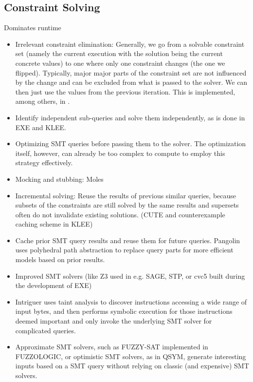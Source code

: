 \documentclass{article}
\begin{document}
\begin{multicols}{2}
    \subsection{Constraint Solving}
    \label{ConstraintSolving}
    Dominates runtime
    \begin{itemize}
        \item Irrelevant constraint elimination: Generally, we go from a solvable constraint set (namely the current execution with the solution being the current concrete values) to one where only one constraint changes (the one we flipped). Typically, major major parts of the constraint set are not influenced by the change and can be excluded from what is passed to the solver. We can then just use the values from the previous iteration. This is implemented, among others, in \cite{SAGE}.
        \item Identify independent sub-queries and solve them independently, as is done in EXE\cite{EXE} and KLEE\cite{KLEE}.
        \item Optimizing SMT queries before passing them to the solver. The optimization itself, however, can already be too complex to compute to employ this strategy effectively.
        \item Mocking and stubbing: Moles\cite{Moles}
        \item Incremental solving: Reuse the results of previous similar queries, because subsets of the constraints are still solved by the same results and supersets often do not invalidate existing solutions. (CUTE\cite{CUTE} and counterexample caching scheme in KLEE\cite{KLEE})
        \item Cache prior SMT query results and reuse them for future queries. Pangolin\cite{Pangolin} uses polyhedral path abstraction to replace query parts for more efficient models based on prior results.
        \item Improved SMT solvers (like Z3\cite{Z3} used in e.g. SAGE\cite{SAGE}, STP\cite{STP}, or cvc5\cite{CVC5} built during the development of EXE\cite{EXE})
        \item Intriguer\cite{Intriguer} uses taint analysis to discover instructions accessing a wide range of input bytes, and then performs symbolic execution for those instructions deemed important and only invoke the underlying SMT solver for complicated queries.
        \item Approximate SMT solvers, such as FUZZY-SAT implemented in FUZZOLOGIC\cite{FUZZOLIC}, or optimistic SMT solvers, as in QSYM\cite{QSYM}, generate interesting inputs based on a SMT query without relying on classic (and expensive) SMT solvers.

\end{itemize}
\end{multicols}
\end{document}
